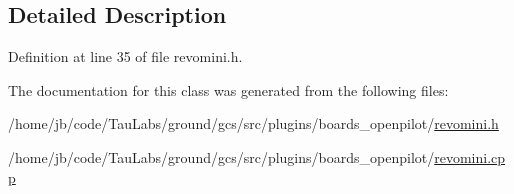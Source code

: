 \subsection{\-Detailed \-Description}


\-Definition at line 35 of file revomini.\-h.



\-The documentation for this class was generated from the following files\-:\begin{DoxyCompactItemize}
\item 
/home/jb/code/\-Tau\-Labs/ground/gcs/src/plugins/boards\-\_\-openpilot/\hyperlink{revomini_8h}{revomini.\-h}\item 
/home/jb/code/\-Tau\-Labs/ground/gcs/src/plugins/boards\-\_\-openpilot/\hyperlink{revomini_8cpp}{revomini.\-cpp}\end{DoxyCompactItemize}
